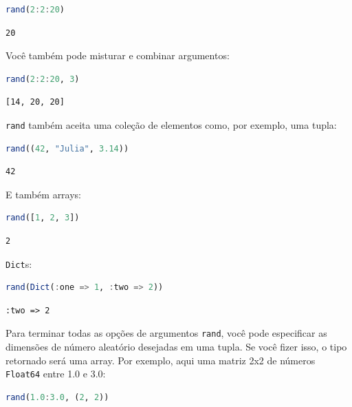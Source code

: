 \documentclass[
  notoc %
]{tufte-book}
\newcommand{\passthrough}[1]{#1}
\begin{document}
\begin{lstlisting}[language=Julia]
rand(2:2:20)
\end{lstlisting}

\begin{lstlisting}[language=Output]
20
\end{lstlisting}

Você também pode misturar e combinar argumentos:

\begin{lstlisting}[language=Julia]
rand(2:2:20, 3)
\end{lstlisting}

\begin{lstlisting}[language=Output]
[14, 20, 20]
\end{lstlisting}

\passthrough{\lstinline!rand!} também aceita uma coleção de elementos
como, por exemplo, uma tupla:

\begin{lstlisting}[language=Julia]
rand((42, "Julia", 3.14))
\end{lstlisting}

\begin{lstlisting}[language=Output]
42
\end{lstlisting}

E também arrays:

\begin{lstlisting}[language=Julia]
rand([1, 2, 3])
\end{lstlisting}

\begin{lstlisting}[language=Output]
2
\end{lstlisting}

\passthrough{\lstinline!Dict!}s:

\begin{lstlisting}[language=Julia]
rand(Dict(:one => 1, :two => 2))
\end{lstlisting}

\begin{lstlisting}[language=Output]
:two => 2
\end{lstlisting}

Para terminar todas as opções de argumentos
\passthrough{\lstinline!rand!}, você pode especificar as dimensões de
número aleatório desejadas em uma tupla. Se você fizer isso, o tipo
retornado será uma array. Por exemplo, aqui uma matriz 2x2 de números
\passthrough{\lstinline!Float64!} entre 1.0 e 3.0:

\begin{lstlisting}[language=Julia]
rand(1.0:3.0, (2, 2))
\end{lstlisting}
\end{document}
